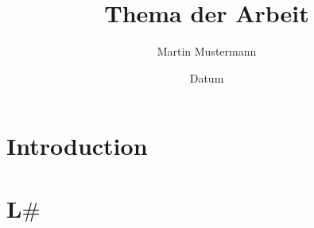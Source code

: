 %
% 
% 
%


\renewcommand{\Thema}{%
    Thema der Arbeit (optional)}

\usepackage{tikz}
\usepackage{amsmath}
\usepackage{amssymb}
\usepackage{stmaryrd}
\usepackage{mathtools}
\usepackage{amsthm}
\usepackage{enumitem}
\usepackage{subcaption}  
\usepackage{caption}
\usepackage{graphicx}

\usetikzlibrary{positioning}
\usetikzlibrary {arrows.meta} 

\theoremstyle{definition}
\newtheorem{theorem}{Theorem}[chapter]
\newtheorem{lemma}[theorem]{Lemma}
\newtheorem{definition}[theorem]{Definition}
\newtheorem{corollary}[theorem]{Corollary}
\newtheorem{proposition}[theorem]{Proposition}




\title{Thema der Arbeit}
\author{Martin Mustermann}
\date{Datum}
\tableofcontents %
\chapter{Introduction}
\chapter{L$\#$}



